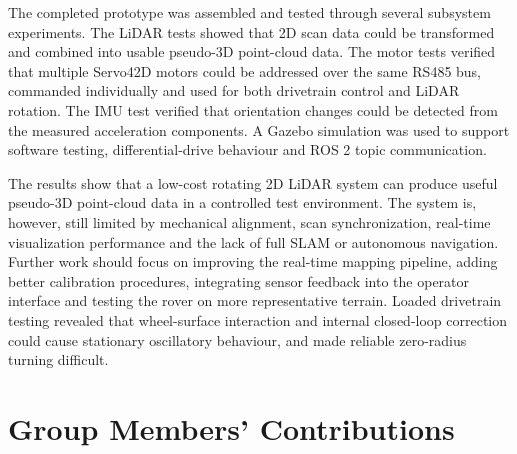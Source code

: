 The completed prototype was assembled and tested through several subsystem experiments. The LiDAR tests showed that 2D scan data could be transformed and combined into usable pseudo-3D point-cloud data. The motor tests verified that multiple Servo42D motors could be addressed over the same RS485 bus, commanded individually and used for both drivetrain control and LiDAR rotation. The IMU test verified that orientation changes could be detected from the measured acceleration components. A Gazebo simulation was used to support software testing, differential-drive behaviour and ROS 2 topic communication.

The results show that a low-cost rotating 2D LiDAR system can produce useful pseudo-3D point-cloud data in a controlled test environment. The system is, however, still limited by mechanical alignment, scan synchronization, real-time visualization performance and the lack of full SLAM or autonomous navigation. Further work should focus on improving the real-time mapping pipeline, adding better calibration procedures, integrating sensor feedback into the operator interface and testing the rover on more representative terrain.
Loaded drivetrain testing revealed that wheel-surface interaction and internal closed-loop correction could cause stationary oscillatory behaviour, and made reliable zero-radius turning difficult.
\newpage
\section*{Group Members' Contributions}

\vspace{0.5cm}

\renewcommand{\arraystretch}{1.3}

